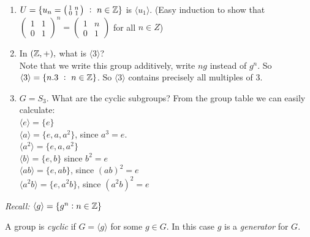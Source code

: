 \documentclass[twoside]{scrartcl}
\begin{document}
\begin{examples} \begin{enumerate}
 \item $U = \{u_n = \left(\begin{smallmatrix}
1 & n \\ 0 & 1	
\end{smallmatrix}\right) ~:~ n \in \mathbb{Z}
\}$	is $\langle u_1 \rangle $. (Easy induction to show that $\left(\begin{smallmatrix}
1 & 1 \\ 0 & 1	
\end{smallmatrix}\right)^n = \left(\begin{smallmatrix}
1 & n \\ 0 & 1	
\end{smallmatrix}\right)$ for all $n \in Z$)
\item In $(\mathbb{Z},+),$ what is $\langle 3 \rangle $?\\
Note that we write this group additively, write $ng$ instead of $g^n$. So $\langle 3 \rangle = \{n.3 ~:~ n \in \mathbb{Z}\}$. So $\langle 3 \rangle$ contains precisely all multiples of 3.
\item $G = S_3$. What are the cyclic subgroups? From the group table we can easily calculate:\\\vspace{5pt}
$\langle e \rangle = \{e\}$\\ \vspace{5pt}
$\langle a \rangle = \{e,a,a^2\}$, since $a^3 = e$.\\\vspace{5pt}
$\langle a^2 \rangle = \{e,a,a^2\}$\\\vspace{5pt}
$\langle b\rangle = \{e,b\}$ since $b^2 = e$\\\vspace{5pt}
$\langle ab \rangle = \{e,ab\}$, since $(ab)^2 = e$\\\vspace{5pt}
$\langle a^2b \rangle = \{e,a^2b\}$, since $(a^2b)^2 = e$\\
 \end{enumerate}
 \end{examples}\vspace*{10pt}
 
\textit{Recall:}   
$\langle g \rangle = \{g^n : n \in \mathbb{Z}\}$\\

\begin{definition} A group is \emph{cyclic} if $G = \langle g \rangle $ for some $g \in G$. In this case $g$ is a \emph{generator} for $G$.
	
\end{definition}\vspace*{10pt}
\end{document}
